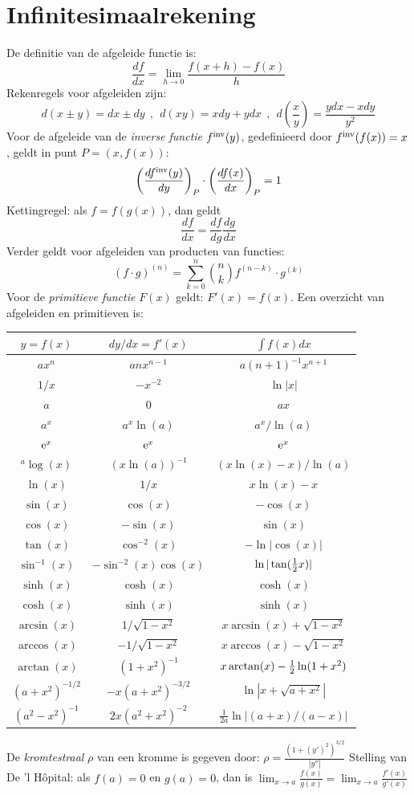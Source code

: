 \documentclass[twoside]{report}
\begin{document}
\section{Infinitesimaalrekening}
De definitie van de afgeleide functie is:
\[
\frac{df}{dx}=\lim_{h\rightarrow0}\frac{f(x+h)-f(x)}{h}
\]
Rekenregels voor afgeleiden zijn:
\[
d(x\pm y)=dx\pm dy~~,~~d(xy)=xdy+ydx~~,~~d\left(\frac{x}{y}\right)=\frac{ydx-xdy}{y^2}
\]
Voor de afgeleide van de {\it inverse functie} $f^{\rm inv}(y)$, gedefinieerd
door $f^{\rm inv}(f(x))=x$, geldt in punt $P=(x,f(x))$:
\[
\left(\frac{df^{\rm inv}(y)}{dy}\right)_P\cdot\left(\frac{df(x)}{dx}\right)_P=1
\]
Kettingregel: als $f=f(g(x))$, dan geldt
\[
\frac{df}{dx}=\frac{df}{dg}\frac{dg}{dx}
\]
Verder geldt voor afgeleiden van producten van functies:
\[
(f\cdot g)^{(n)}=\sum\limits_{k=0}^n{n\choose k}f^{(n-k)}\cdot g^{(k)}
\]
Voor de {\it primitieve functie} $F(x)$ geldt: $F'(x)=f(x)$.
Een overzicht van afgeleiden en primitieven is:
\begin{center}
\begin{tabular}{||c|c|c||}
\hline
\boldmath$y=f(x)$\unboldmath&\boldmath$dy/dx=f'(x)$\unboldmath&\boldmath$\int f(x)dx$\rule{0pt}{12pt}\rule[-7pt]{0pt}{0pt}\unboldmath\\
\hline
\hline
$ax^n$&$anx^{n-1}$&$a(n+1)^{-1}x^{n+1}$\rule{0pt}{12pt}\\
$1/x$&$-x^{-2}$&$\ln|x|$\\
$a$&$0$&$ax$\\
\hline
$a^x$&$a^x\ln(a)$&$a^x/\ln(a)$\rule{0pt}{12pt}\\
${\rm e}^x$&${\rm e}^x$&${\rm e}^x$\\
$^a\log(x)$&$(x\ln(a))^{-1}$&$(x\ln(x)-x)/\ln(a)$\\
$\ln(x)$&$1/x$&$x\ln(x)-x$\\
\hline
$\sin(x)$&$\cos(x)$&$-\cos(x)$\\
$\cos(x)$&$-\sin(x)$&$\sin(x)$\\
$\tan(x)$&$\cos^{-2}(x)$&$-\ln|\cos(x)|$\\
$\sin^{-1}(x)$&$-\sin^{-2}(x)\cos(x)$&$\ln|\tan(\mbox{$\frac{1}{2}$} x)|$\\
$\sinh(x)$&$\cosh(x)$&$\cosh(x)$\\
$\cosh(x)$&$\sinh(x)$&$\sinh(x)$\\
$\arcsin(x)$&$1/\sqrt{1-x^2}$&$x\arcsin(x)+\sqrt{1-x^2}$\\
$\arccos(x)$&$-1/\sqrt{1-x^2}$&$x\arccos(x)-\sqrt{1-x^2}$\\
$\arctan(x)$&$(1+x^2)^{-1}$&$x\arctan(x)-\mbox{$\frac{1}{2}$}\ln(1+x^2)$\rule[-7pt]{0pt}{0pt}\\
\hline
$(a+x^2)^{-1/2}$&$-x(a+x^2)^{-3/2}$&$\ln|x+\sqrt{a+x^2}|$\rule{0pt}{12pt}\\
$(a^2-x^2)^{-1}$&$2x(a^2+x^2)^{-2}$&$\displaystyle\frac{1}{2a}\ln|(a+x)/(a-x)|$\rule[-10pt]{0pt}{23pt}\\
\hline
\end{tabular}
\end{center}
De {\it kromtestraal} $\rho$ van een kromme is gegeven door:
$\displaystyle\rho=\frac{(1+(y')^2)^{3/2}}{|y''|}$
\npar
Stelling van De 'l H\^opital: als $f(a)=0$ en $g(a)=0$, dan is
$\displaystyle\lim_{x\rightarrow a}\frac{f(x)}{g(x)}=\lim_{x\rightarrow a}\frac{f'(x)}{g'(x)}$
\end{document}
